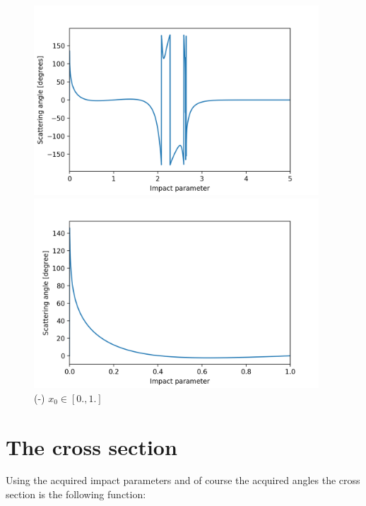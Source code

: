 \documentclass[a4paper,12pt]{article}
\begin{document}
\begin{figure}[H]
	\centering
	\begin{minipage}{0.5\textwidth}
		\centering
		\includegraphics[width=0.95\textwidth]{./chaotic-scattering-co1signed.png}
		\caption{ (-) $x_{0} \in [0., 5.]$ }
	\end{minipage}\hfill
	\begin{minipage}{0.5\textwidth}
		\centering
		\includegraphics[width=0.95\textwidth]{./chaotic-scattering-co2signed.png}
		\caption{ (-) $x_{0} \in [0., 1.]$}
	\end{minipage}
\end{figure}

\section{The cross section}

\par Using the acquired impact parameters and  of course the acquired angles the
cross section is the following function:
\end{document}
